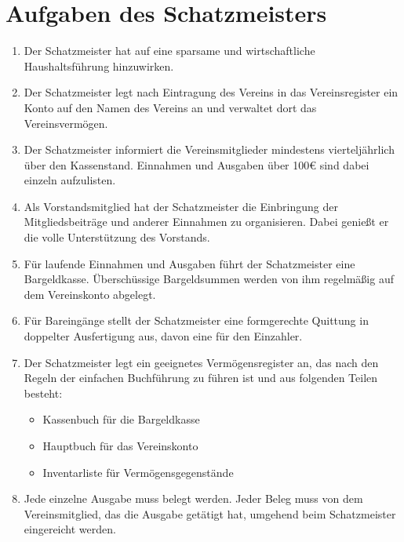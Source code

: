 \documentclass[fontsize=12pt,paper=a4,pagesize,headings=small]{scrartcl}
\begin{document}
\section{Aufgaben des Schatzmeisters}
\begin{enumerate}
    \item Der Schatzmeister hat auf eine sparsame und wirtschaftliche
        Haushaltsführung hinzuwirken.

    \item Der Schatzmeister legt nach Eintragung des Vereins in das
        Vereinsregister ein Konto auf den Namen des Vereins an und
        verwaltet dort das Vereinsvermögen.

    \item Der Schatzmeister informiert die Vereinsmitglieder
        mindestens vierteljährlich über den Kassenstand. Einnahmen und
        Ausgaben über 100\euro{} sind dabei einzeln aufzulisten.

    \item Als Vorstandsmitglied hat der Schatzmeister die Einbringung der
        Mitgliedsbeiträge und anderer Einnahmen zu organisieren. Dabei
        genießt er die volle Unterstützung des Vorstands.

    \item Für laufende Einnahmen und Ausgaben führt der Schatzmeister eine
        Bargeldkasse. Überschüssige Bargeldsummen werden von ihm regelmäßig
        auf dem Vereinskonto abgelegt.

    \item Für Bareingänge stellt der Schatzmeister eine formgerechte
        Quittung in doppelter Ausfertigung aus, davon eine für den Einzahler.

    \item Der Schatzmeister legt ein geeignetes Vermögensregister an, das
        nach den Regeln der einfachen Buchführung zu führen ist und aus
        folgenden Teilen besteht:
        \begin{itemize}
            \item Kassenbuch für die Bargeldkasse
            \item Hauptbuch für das Vereinskonto
            \item Inventarliste für Vermögensgegenstände
        \end{itemize}

    \item Jede einzelne Ausgabe muss belegt werden. Jeder Beleg muss von
        dem Vereinsmitglied, das die Ausgabe getätigt hat, umgehend beim
        Schatzmeister eingereicht werden.


\end{enumerate}
\end{document}

